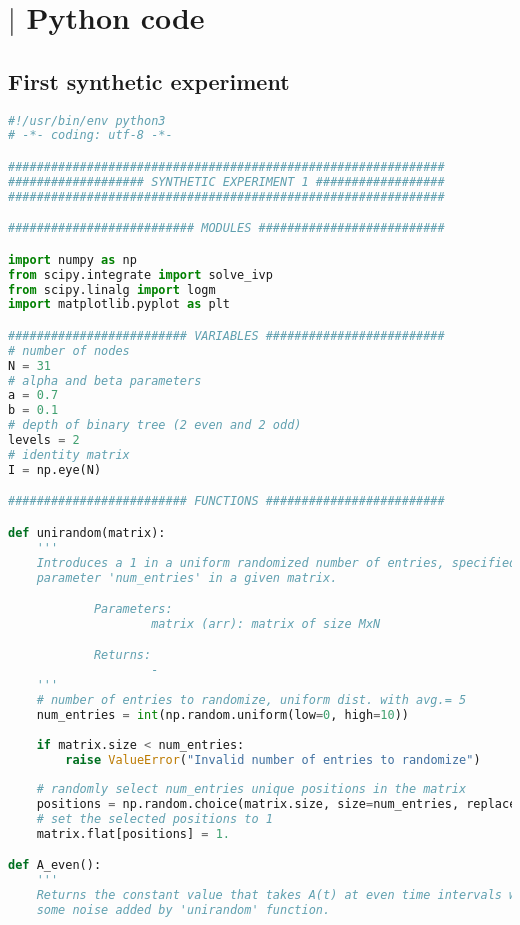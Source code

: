 \chapter{$\vert$ Python code}
\label{chap:appa}

\section*{First synthetic experiment}
\label{sec:fse}

\begin{lstlisting}[language=Python, caption=First synthetic experiment]
#!/usr/bin/env python3
# -*- coding: utf-8 -*-

#############################################################
################### SYNTHETIC EXPERIMENT 1 ##################
#############################################################

########################## MODULES ##########################

import numpy as np
from scipy.integrate import solve_ivp
from scipy.linalg import logm
import matplotlib.pyplot as plt

######################### VARIABLES #########################
# number of nodes
N = 31 
# alpha and beta parameters
a = 0.7
b = 0.1
# depth of binary tree (2 even and 2 odd)
levels = 2
# identity matrix
I = np.eye(N) 

######################### FUNCTIONS #########################

def unirandom(matrix):
    '''
    Introduces a 1 in a uniform randomized number of entries, specified by the 
    parameter 'num_entries' in a given matrix.

            Parameters:
                    matrix (arr): matrix of size MxN

            Returns:
                    -
    '''
    # number of entries to randomize, uniform dist. with avg.= 5
    num_entries = int(np.random.uniform(low=0, high=10))
    
    if matrix.size < num_entries:
        raise ValueError("Invalid number of entries to randomize")
        
    # randomly select num_entries unique positions in the matrix
    positions = np.random.choice(matrix.size, size=num_entries, replace=False)
    # set the selected positions to 1
    matrix.flat[positions] = 1.

def A_even():
    '''
    Returns the constant value that takes A(t) at even time intervals with 
    some noise added by 'unirandom' function.


\end{lstlisting}
